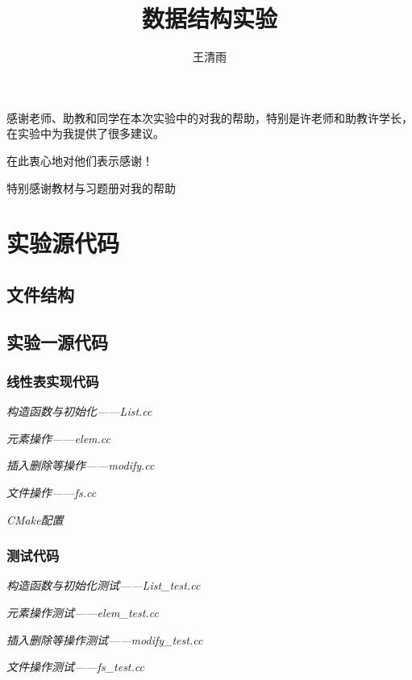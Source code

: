 \documentclass[format=draft,language=chinese,category=academic-report]{hustreport}
\title{数据结构实验}
\author{王清雨}
\begin{document}
\frontmatter
\maketitle
\makeabstract
\tableofcontents
\mainmatter


\backmatter

\begin{ack}
    感谢老师、助教和同学在本次实验中的对我的帮助，特别是许老师和助教许学长，在实验中为我提供了很多建议。
    \par
    在此衷心地对他们表示感谢！
    \par
    特别感谢教材\cite{严蔚敏2002数据结构}与习题册\cite{严蔚敏1998数据结构题集}对我的帮助
\end{ack}



\appendix

\chapter{实验源代码}\label{appendix:1}
\section{文件结构}\label{appendix:structure}

\section{实验一源代码}\label{appendix:lab1}
\subsection{线性表实现代码}
\emph{构造函数与初始化——List.cc}

\emph{元素操作——elem.cc}

\emph{插入删除等操作——modify.cc}

\emph{文件操作——fs.cc}

\emph{CMake配置}

\subsection{测试代码}\label{appendix:test1}
\emph{构造函数与初始化测试——List\_test.cc}

\emph{元素操作测试——elem\_test.cc}

\emph{插入删除等操作测试——modify\_test.cc}

\emph{文件操作测试——fs\_test.cc}

\end{document}
